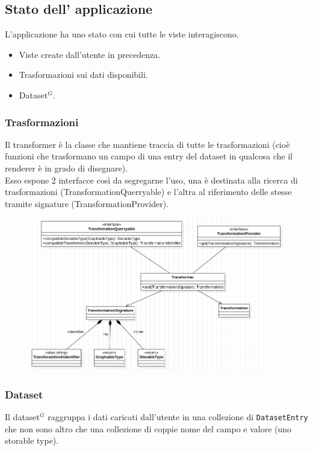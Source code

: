 \subsection{Stato dell' applicazione}
L'applicazione ha uno stato con cui tutte le viste interagiscono.
\begin{itemize}
  \item Viste create dall'utente in precedenza.
  \item Trasformazioni sui dati disponibili.
  \item Dataset$^{G}$.
\end{itemize}

\subsubsection{Trasformazioni}
Il transformer è la classe che mantiene traccia di tutte le trasformazioni (cioè
funzioni che trasformano un campo di una entry del dataset in qualcosa che il
renderer è in grado di disegnare). \\
Esso espone 2 interfacce così da segregarne l'uso, una è destinata alla ricerca di
trasformazioni (TransformationQuerryable) e l'altra al riferimento delle stesse tramite
signature (TransformationProvider).
\begin{figure}[h!]
  \centering
  \includegraphics[scale=0.65]{../../assets/classi_uml/modeltransfomer.png}
\end{figure}

\subsubsection{Dataset}
Il dataset$^{G}$ raggruppa i dati caricati dall'utente in una collezione di
\texttt{DatasetEntry} che non sono altro che una collezione di coppie nome del
campo e valore (uno storable type). \\

